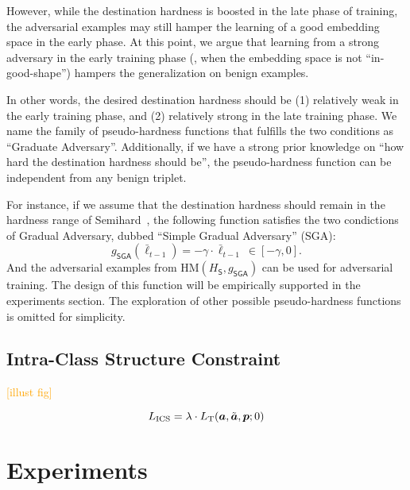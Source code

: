 \documentclass[10pt,twocolumn,letterpaper]{article}
\newcommand{\oo}[1]{\textcolor{orange}{#1}}
\begin{document}

However, while the destination hardness is boosted in the late phase of
training, the adversarial examples may still hamper the learning of a good
embedding space in the early phase.
%
At this point, we argue that learning from a strong adversary in the early
training phase (\ie, when the embedding space is not ``in-good-shape'') hampers the
generalization on benign examples.


In other words, the desired destination hardness should be (1) relatively weak
in the early training phase, and (2) relatively strong in the late training
phase.
%
We name the family of pseudo-hardness functions that fulfills the two
conditions as ``Graduate Adversary''.
%
Additionally, if we have a strong prior knowledge on ``how hard the destination
hardness should be'', the pseudo-hardness function can be independent from
any benign triplet.


For instance, if we assume that the destination hardness should remain
in the hardness range of Semihard~\cite{facenet}, the following function
satisfies the two condictions of Gradual Adversary, dubbed
``Simple Gradual Adversary'' (SGA):
%
\begin{equation}
	g_\mathsf{SGA}(\bar{\ell}_{t-1}) =
	-\gamma \cdot \bar{\ell}_{t-1} ~ \in [-\gamma,0].
\end{equation}
%
And the adversarial examples from $\text{HM}(H_\mathsf{S},g_\mathsf{SGA})$
can be used for adversarial training.
%
The design of this function will be empirically supported in the experiments
section.
%
The exploration of other possible pseudo-hardness functions is omitted 
for simplicity.

\subsection{Intra-Class Structure Constraint}
\label{sec:33}

\oo{[illust fig]}

\begin{equation}
	L_\text{ICS} = \lambda \cdot L_\text{T}(
	{\bm{a}}, \tilde{{\bm{a}}}, {\bm{p}}; 0)
\end{equation}

\section{Experiments}
\label{sec:4}
\end{document}
